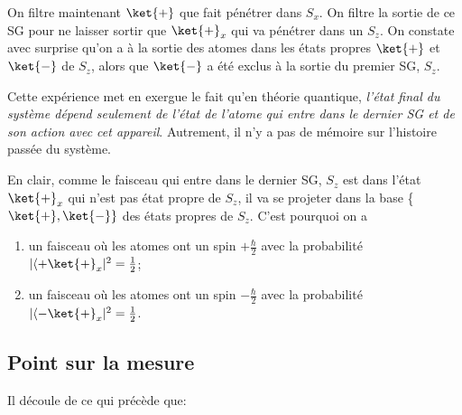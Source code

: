On filtre maintenant $\ket{+}$ que fait pénétrer dans $S_{x}$. On filtre la
sortie de ce SG pour ne laisser sortir que $\ket{+}_{x}$ qui va pénétrer dans
un $S_{z}$. On constate avec surprise qu'on a à la sortie des atomes dans les
états propres $\ket{+}$ et $\ket{-}$ de $S_{z}$, alors que $\ket{-}$ a été
exclus à la sortie du premier SG, $S_{z}$.

Cette expérience met en exergue le fait qu'en théorie quantique, \emph{l'état
final du système dépend seulement de l'état de l'atome qui entre dans le dernier
SG et de son action avec cet appareil}. Autrement, il n'y a pas de mémoire sur
l'histoire passée du système.

En clair, comme le faisceau qui entre dans le dernier SG, $S_{z}$ est dans
l'état  $\ket{+}_{x}$ qui n'est pas état propre de $S_{z}$, il va se projeter
dans la base  \{$\ket{+},\ket{-}\}$ des états propres de $S_{z}$. C'est
pourquoi on a

\begin{enumerate}
\item un faisceau où les atomes ont un spin $+\frac{\hbar}{2}$ avec la
probabilité $|\langle+\ket{+}_{x}|^{2}=\frac{1}{2}$;

\item un faisceau où les atomes ont un spin $-\frac{\hbar}{2}$ avec la
probabilité $|\langle-\ket{+}_{x}|^{2}=\frac{1}{2}$.
\end{enumerate}

\subsection{Point sur la mesure}

Il découle de ce qui précède que:

